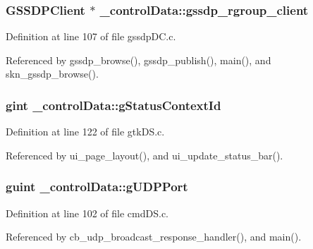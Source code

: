 \subsubsection[{gssdp\+\_\+rgroup\+\_\+client}]{\setlength{\rightskip}{0pt plus 5cm}G\+S\+S\+D\+P\+Client $\ast$ \+\_\+control\+Data\+::gssdp\+\_\+rgroup\+\_\+client}\label{struct__control_data_a05dec2c5c598d299306a41430093b6de}


Definition at line 107 of file gssdp\+D\+C.\+c.



Referenced by gssdp\+\_\+browse(), gssdp\+\_\+publish(), main(), and skn\+\_\+gssdp\+\_\+browse().

\hypertarget{struct__control_data_aae36ce9466663c5765139bb92e9f8d49}{}
\subsubsection[{g\+Status\+Context\+Id}]{\setlength{\rightskip}{0pt plus 5cm}gint \+\_\+control\+Data\+::g\+Status\+Context\+Id}\label{struct__control_data_aae36ce9466663c5765139bb92e9f8d49}


Definition at line 122 of file gtk\+D\+S.\+c.



Referenced by ui\+\_\+page\+\_\+layout(), and ui\+\_\+update\+\_\+status\+\_\+bar().

\hypertarget{struct__control_data_a78b36762a9d85d027fc5e41576ade4f7}{}
\subsubsection[{g\+U\+D\+P\+Port}]{\setlength{\rightskip}{0pt plus 5cm}guint \+\_\+control\+Data\+::g\+U\+D\+P\+Port}\label{struct__control_data_a78b36762a9d85d027fc5e41576ade4f7}


Definition at line 102 of file cmd\+D\+S.\+c.



Referenced by cb\+\_\+udp\+\_\+broadcast\+\_\+response\+\_\+handler(), and main().

\hypertarget{struct__control_data_ae1b70bafbd5eb568c6ca339664959216}{}
